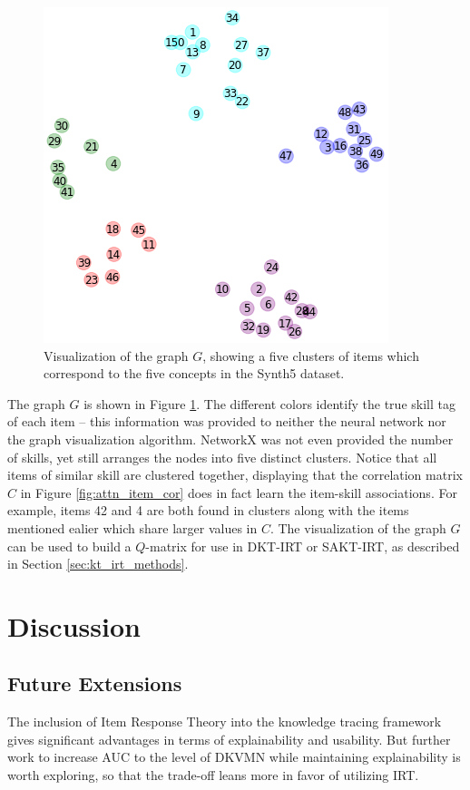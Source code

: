 \begin{figure}[h]
  \centering
  \includegraphics[width=.55\textwidth]{img/kt_irt/synth5_clusters_no_ffn.png}
  \caption{Visualization of the graph $G$, showing a five clusters of items which correspond to the five concepts in the Synth5 dataset.}
  \label{fig:synth5_clusters}
\end{figure}
The graph $G$ is shown in Figure \ref{fig:synth5_clusters}. The different colors identify the true skill tag of each item -- this information was provided to neither the neural network nor the graph visualization algorithm. NetworkX was not even provided the number of skills, yet still arranges the nodes into five distinct clusters. Notice that all items of similar skill are clustered together, displaying that the correlation matrix $C$ in Figure \ref{fig:attn_item_cor} does in fact learn the item-skill associations. For example, items 42 and 4 are both found in clusters along with the items mentioned ealier which share larger values in $C$. The visualization of the graph $G$ can be used to build a $Q$-matrix for use in DKT-IRT or SAKT-IRT, as described in Section \ref{sec:kt_irt_methods}.

\section{Discussion}

\subsection{Future Extensions} 
The inclusion of Item Response Theory into the knowledge tracing framework gives significant advantages in terms of explainability and usability. But further work to increase AUC to the level of DKVMN while maintaining explainability is worth exploring, so that the trade-off leans more in favor of utilizing IRT. 

